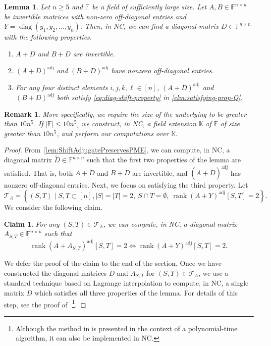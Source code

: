 \documentclass[11pt,letterpaper]{article}
\DeclareMathOperator*{\diag}{diag}
\DeclareMathOperator*{\rank}{rank}
\newcommand{\F}{\mathbb{F}}
\newtheorem{lemma}{Lemma}[section]
\newtheorem{claim}{Claim}[section]
\newtheorem{remark}{Remark}[section]
\DeclareMathOperator{\ad}{adj}
\newcommand{\adj}[1]{(#1)^{\ad}}
\begin{document}
{{{\begin{lemma}
\label{lem:findDwithQ}
Let $n\geq 5$ and $\mathbb{F}$ be a field of sufficiently large size. Let $A,B\in \mathbb{F}^{n \times n}$ be invertible matrices with non-zero off-diagonal entries and $Y=\diag(y_1,y_2,\dots,y_n)$. Then, in NC, we can find a diagonal matrix $D\in \mathbb{F}^{n\times n}$  with the following properties.
\begin{enumerate}
\item $A+D$ and $B+D$ are invertible.
\item $\adj{A+D}$ and $\adj{B+D}$ have nonzero off-diagonal entries.
\item For any four distinct elements $i,j,k,\ell\in [n]$, $\adj{A+D}$ and $\adj{B+D}$ both satisfy \cref{eq:diag-shift-property} in \cref{clm:satisfying-prop-Q}.
\end{enumerate}
\end{lemma}
\begin{remark}
More specifically, we require the size of the underlying to be greater than $10n^5$. If $|\F|\leq 10n^5$, we construct, in NC, a field extension $\mathbb K$ of $\F$ of size greater than $10n^5$, and perform our computations over $\mathbb K$.
\end{remark}
\begin{proof}
From~\cref{lem:ShiftAdjugatePreservesPME}, we can compute, in NC, a diagonal matrix $\widetilde D\in \F^{n\times n}$ such that the first two properties of the lemma are satisfied. That is, both $A+\widetilde D$ and $B+\widetilde D$ are invertible, and $\adj{A+\widetilde D}$ has nonzero off-diagonal entries. Next, we focus on satisfying the third property. Let $$\mathcal{T}_A  =\left\{(S,T)\mid S,T\subset [n], |S|=|T|=2,\ S\cap T=\emptyset,\  \rank \adj{A+Y}[S,T] =2\right\}.$$
We consider the following claim.
\begin{claim}
\label{clm:3typeMatrix}
For any $(S, T)\in \mathcal T_A$, we can compute, in NC, a diagonal matrix $A_{S,T}\in \mathbb{F}^{n\times n} $  such that $$\rank \adj{A+A_{S,T}}[S,T]=2 \Longleftrightarrow \rank \adj{A+Y}[S,T]=2.$$
\end{claim}
We defer the proof of the claim to the end of the section. Once we have constructed the diagonal matrices $\widetilde D$ and $A_{S,T}$ for $(S, T)\in \mathcal T_A$,  we use a standard technique based on Lagrange interpolation to compute, in NC, a single matrix $D$ which satisfies all three properties of the lemma. For details of this step, see the proof of~\cite[Claim~4.1]{Chatterjee25}\,\footnote{Although the method in \cite[Claim~4.1]{Chatterjee25} is presented in the context of a polynomial-time algorithm, it can also be implemented in NC.}. 

\end{proof}}}}
\end{document}
